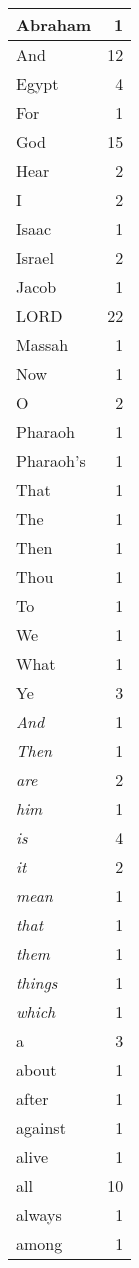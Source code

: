 \begin{center}
\begin{longtable}{l|r}
\hline \hline
\endlastfoot
Abraham & 1 \\ \hline
And & 12 \\ \hline
Egypt & 4 \\ \hline
For & 1 \\ \hline
God & 15 \\ \hline
Hear & 2 \\ \hline
I & 2 \\ \hline
Isaac & 1 \\ \hline
Israel & 2 \\ \hline
Jacob & 1 \\ \hline
LORD & 22 \\ \hline
Massah & 1 \\ \hline
Now & 1 \\ \hline
O & 2 \\ \hline
Pharaoh & 1 \\ \hline
Pharaoh's & 1 \\ \hline
That & 1 \\ \hline
The & 1 \\ \hline
Then & 1 \\ \hline
Thou & 1 \\ \hline
To & 1 \\ \hline
We & 1 \\ \hline
What & 1 \\ \hline
Ye & 3 \\ \hline
\emph{And} & 1 \\ \hline
\emph{Then} & 1 \\ \hline
\emph{are} & 2 \\ \hline
\emph{him} & 1 \\ \hline
\emph{is} & 4 \\ \hline
\emph{it} & 2 \\ \hline
\emph{mean} & 1 \\ \hline
\emph{that} & 1 \\ \hline
\emph{them} & 1 \\ \hline
\emph{things} & 1 \\ \hline
\emph{which} & 1 \\ \hline
a & 3 \\ \hline
about & 1 \\ \hline
after & 1 \\ \hline
against & 1 \\ \hline
alive & 1 \\ \hline
all & 10 \\ \hline
always & 1 \\ \hline
among & 1 \\ \hline

\end{longtable}
\end{center}
